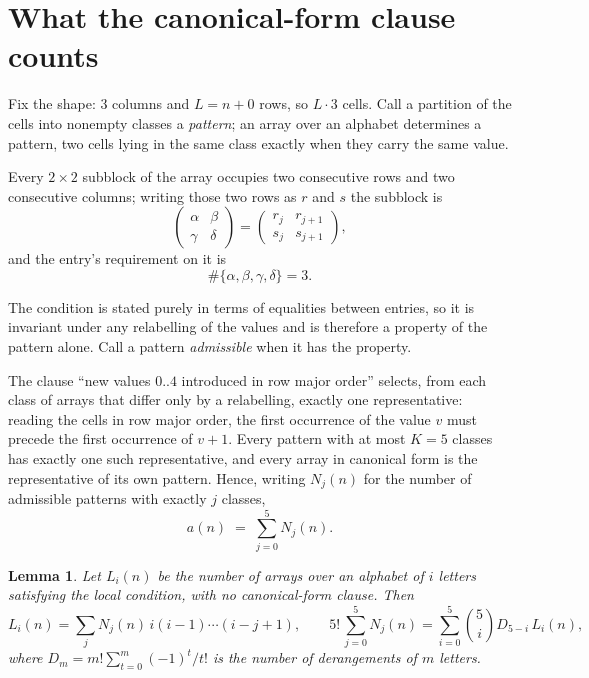 \documentclass[11pt,a4paper]{article}
\theoremstyle{plain}
\newtheorem{lemma}[theorem]{Lemma}
\theoremstyle{definition}
\begin{document}
\section{What the canonical-form clause counts}

Fix the shape: $3$ columns and $L=n+0$ rows, so $L\cdot3$ cells. Call a
partition of the cells into nonempty classes a \emph{pattern}; an array over an alphabet
determines a pattern, two cells lying in the same class exactly when they carry the same
value.

Every $2\times2$ subblock of the array occupies two consecutive
rows and two consecutive columns; writing those two rows as $r$ and $s$ the
subblock is
\[
\begin{pmatrix}\alpha&\beta\\\gamma&\delta\end{pmatrix}=\begin{pmatrix}r_j&r_{j+1}\\s_j&s_{j+1}\end{pmatrix},
\]
and the entry's requirement on it is
\begin{equation}\label{eq:loc}
\#\{\alpha,\beta,\gamma,\delta\}=3.
\end{equation}

The condition is stated purely in terms of equalities between entries, so it is invariant
under any relabelling of the values and is therefore a property of the pattern alone. Call a
pattern \emph{admissible} when it has the property.

The clause ``new values $0..4$ introduced in row major order'' selects, from each class
of arrays that differ only by a relabelling, exactly one representative: reading the cells in
row major order, the first occurrence of the value $v$ must precede the first occurrence of
$v+1$. Every pattern with at most $K=5$ classes has exactly one such representative, and
every array in canonical form is the representative of its own pattern. Hence, writing
$N_j(n)$ for the number of admissible patterns with exactly $j$ classes,
\begin{equation}\label{eq:apat}
a(n)\;=\;\sum_{j=0}^{5}N_j(n).
\end{equation}

\begin{lemma}\label{lem:inv}
Let $L_i(n)$ be the number of arrays over an alphabet of $i$ letters satisfying the local
condition, with no canonical-form clause. Then
\[
L_i(n)=\sum_j N_j(n)\,i(i-1)\cdots(i-j+1),
\qquad
5!\,\sum_{j=0}^{5}N_j(n)=\sum_{i=0}^{5}\binom{5}{i}D_{5-i}\,L_i(n),
\]
where $D_m=m!\sum_{t=0}^{m}(-1)^t/t!$ is the number of derangements of $m$ letters.
\end{lemma}
\end{document}

